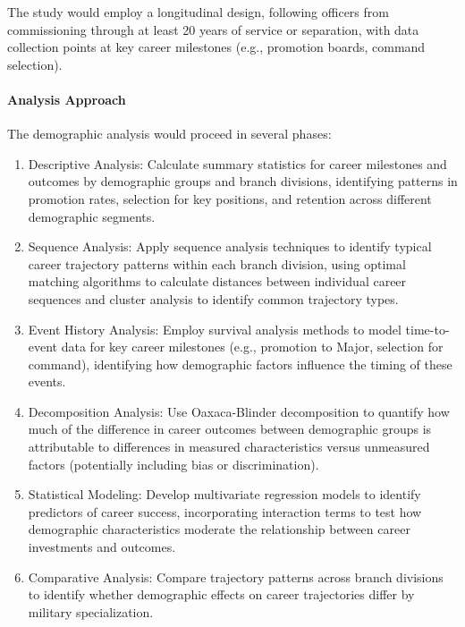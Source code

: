\documentclass[./main.tex]{subfiles}
\begin{document}
The study would employ a longitudinal design, following officers from
commissioning through at least 20 years of service or separation, with
data collection points at key career milestones (e.g., promotion boards,
command selection).

\paragraph{Analysis Approach}\label{analysis-approach}

The demographic analysis would proceed in several phases:

\begin{enumerate}
\def\labelenumi{\arabic{enumi}.}
\item
  Descriptive Analysis: Calculate summary statistics for career
  milestones and outcomes by demographic groups and branch divisions,
  identifying patterns in promotion rates, selection for key positions,
  and retention across different demographic segments.
\item
  Sequence Analysis: Apply sequence analysis techniques to identify
  typical career trajectory patterns within each branch division, using
  optimal matching algorithms to calculate distances between individual
  career sequences and cluster analysis to identify common trajectory
  types.
\item
  Event History Analysis: Employ survival analysis methods to model
  time-to-event data for key career milestones (e.g., promotion to
  Major, selection for command), identifying how demographic factors
  influence the timing of these events.
\item
  Decomposition Analysis: Use Oaxaca-Blinder decomposition to quantify
  how much of the difference in career outcomes between demographic
  groups is attributable to differences in measured characteristics
  versus unmeasured factors (potentially including bias or
  discrimination).
\item
  Statistical Modeling: Develop multivariate regression models to
  identify predictors of career success, incorporating interaction terms
  to test how demographic characteristics moderate the relationship
  between career investments and outcomes.
\item
  Comparative Analysis: Compare trajectory patterns across branch
  divisions to identify whether demographic effects on career
  trajectories differ by military specialization.
\end{enumerate}
\end{document}
